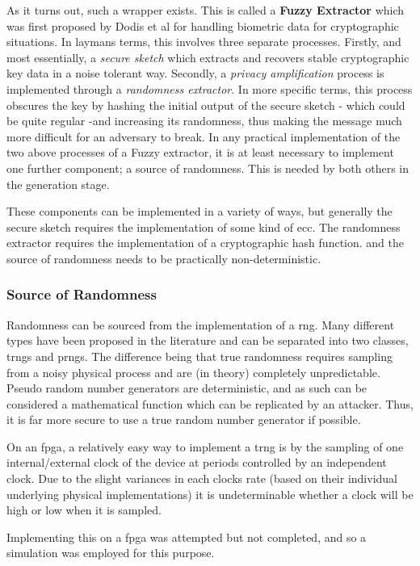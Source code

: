 As it turns out, such a wrapper exists. This is called a \textbf{Fuzzy Extractor} which
was first proposed by Dodis et al\cite{dodis2004fuzzy} for handling biometric data for cryptographic situations.
In laymans terms, this involves three separate processes.
Firstly, and most essentially, a \emph{secure sketch} which extracts and recovers stable
cryptographic key data in a noise tolerant way.
Secondly, a \emph{privacy amplification} process is implemented through a \emph{randomness extractor}.
In more specific terms, this process obscures the key by hashing the initial
output of the secure sketch - which could be quite regular -and increasing its randomness, thus making the message much more difficult for an adversary to break.
In any practical implementation of the two above processes of a Fuzzy extractor,
it is at least necessary to implement one further component; a source of randomness.
This is needed by both others in the generation stage.

These components can be implemented in a variety of ways, but generally the secure sketch requires the implementation of some kind of \gls{ecc}.
The randomness extractor requires the implementation of a cryptographic hash
function. and the source of randomness needs to be practically non-deterministic.

\subsubsection{Source of Randomness}
Randomness can be sourced from the implementation of a \gls{rng}.
Many different types have been proposed in the literature and can be separated
into two classes, \glspl{trng} and \glspl{prng}.
The difference being that true randomness requires sampling
from a noisy physical process and are (in theory) completely unpredictable.
Pseudo random number generators are deterministic, and as such can be considered a mathematical function which can be replicated by an attacker.
Thus, it is far more secure to use a true random number generator if possible.

On an \gls{fpga}, a relatively easy way to implement a \gls{trng} is by
the sampling of one internal/external clock of the device at periods controlled
by an independent clock.
Due to the slight variances in each clocks rate (based on their individual
underlying physical implementations) it is undeterminable
whether a clock will be high or low when it is sampled.

Implementing this on a \gls{fpga} was attempted but not completed, and so a
\matlab simulation was employed for this purpose.

